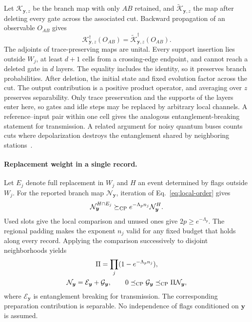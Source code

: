 \documentclass[aps,prl,twocolumn,superscriptaddress,longbibliography,reprint,floatfix]{revtex4-2}
\begin{document}
Let $\mathcal K_{\boldsymbol y,z}$ be the branch map with only $AB$ retained, and
$\widetilde{\mathcal K}_{\boldsymbol y,z}$ the map after deleting every gate across
the associated cut. Backward propagation of an observable $O_{AB}$ gives
\begin{equation}
 \mathcal K_{\boldsymbol y,z}^{\dagger}(O_{AB})
 =\widetilde{\mathcal K}_{\boldsymbol y,z}^{\dagger}(O_{AB}).
 \label{eq:adjoint}
\end{equation}
The adjoints of trace-preserving maps are unital. Every support insertion lies outside
$W_j$, at least $d+1$ cells from a crossing-edge endpoint, and cannot
reach a deleted gate in $d$ layers. The equality includes the identity,
so it preserves branch probabilities. After deletion, the initial
state and fixed evolution factor across the cut. The output contribution
is a positive product operator, and averaging over $z$ preserves separability.
Only trace preservation and the supports of the layers enter here, so
gates and idle steps may be replaced by arbitrary local channels.
A reference--input pair within one cell gives the analogous
entanglement-breaking statement for transmission. A related argument for
noisy quantum buses counts cuts where depolarization destroys the
entanglement shared by neighboring stations~\cite{Choe2024}.

\smallskip
\paragraph*{Replacement weight in a single record.}
Let $E_j$ denote full replacement in $W_j$ and $H$ an event determined
by flags outside $W_j$. For the reported branch map $\mathcal N_{\boldsymbol y}$, iteration
of Eq.~\eqref{eq:local-order} gives
\begin{equation}
 \mathcal N_{\boldsymbol y}^{H\cap E_j}
 \succeq_{\rm CP}e^{-\Lambda_p n_j}\mathcal N_{\boldsymbol y}^{H} .
 \label{eq:window-domination}
\end{equation}
Used slots give the local comparison and unused ones give $2p\ge e^{-\Lambda_p}$.
The regional padding makes the exponent $n_j$ valid for any fixed
budget that holds along every record. Applying the comparison
successively to disjoint neighborhoods yields
\begin{equation}
 \begin{gathered}
 \Pi=\prod_j(1-e^{-\Lambda_p n_j}),\\
 \mathcal N_{\boldsymbol y}=\mathcal E_{\boldsymbol y}+\mathcal G_{\boldsymbol y},\qquad
 0\preceq_{\rm CP}\mathcal G_{\boldsymbol y}
       \preceq_{\rm CP}\Pi\mathcal N_{\boldsymbol y} ,
 \end{gathered}
 \label{eq:branch-domination}
\end{equation}
where $\mathcal E_{\boldsymbol y}$ is entanglement breaking for transmission.
The corresponding preparation contribution is separable. No
independence of flags conditioned on $\boldsymbol y$ is assumed.
\end{document}
